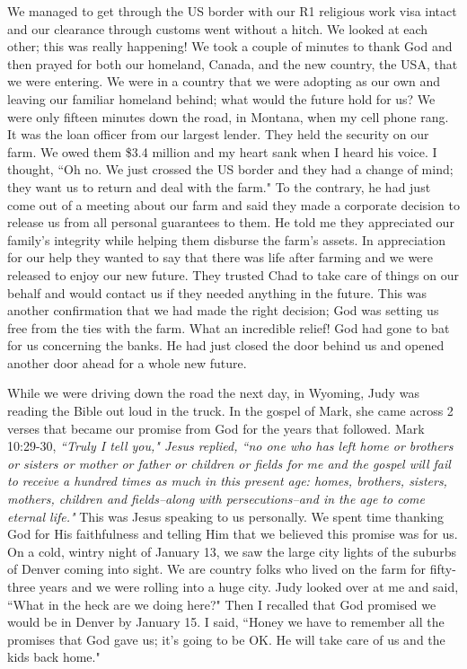 \documentclass[oneside,12pt]{book}
\begin{document}
We managed to get through the US border with our R1 religious work visa intact and our clearance through customs went without a hitch. We looked at each other; this was really happening! We took a couple of minutes to thank God and then prayed for both our homeland, Canada, and the new country, the USA, that we were entering.  We were in a country that we were adopting as our own and leaving our familiar homeland behind; what would the future hold for us? We were only fifteen minutes down the road, in Montana, when my cell phone rang. It was the loan officer from our largest lender. They held the security on our farm. We owed them \$3.4 million and my heart sank when I heard his voice. I thought, ``Oh no. We just crossed the US border and they had a change of mind; they want us to return and deal with the farm." To the contrary, he had just come out of a meeting about our farm and said they made a corporate decision to release us from all personal guarantees to them. He told me they appreciated our family's integrity while helping them disburse the farm's assets. In appreciation for our help they wanted to say that there was life after farming and we were released to enjoy our new future. They trusted Chad to take care of things on our behalf and would contact us if they needed anything in the future. This was another confirmation that we had made the right decision; God was setting us free from the ties with the farm. What an incredible relief! God had gone to bat for us concerning the banks. He had just closed the door behind us and opened another door ahead for a whole new future.

While we were driving down the road the next day, in Wyoming, Judy was reading the Bible out loud in the truck. In the gospel of Mark, she came across 2 verses that became our promise from God for the years that followed. Mark 10:29-30, \textit{``Truly I tell you," Jesus replied, ``no one who has left home or brothers or sisters or mother or father or children or fields for me and the gospel will fail to receive a hundred times as much in this present age: homes, brothers, sisters, mothers, children and fields--along with persecutions--and in the age to come eternal life."} This was Jesus speaking to us personally. We spent time thanking God for His faithfulness and telling Him that we  believed this promise was for us. On a cold, wintry night of January 13, we saw the large city lights of the suburbs of Denver coming into sight. We are country folks who lived on the farm for fifty-three years and we were rolling into a huge city. Judy looked over at me and said, ``What in the heck are we doing here?" Then I recalled that God promised we would be in Denver by January 15. I said, ``Honey we have to remember all the promises that God gave us; it's going to be OK. He will take care of us and the kids back home."  
\end{document}
